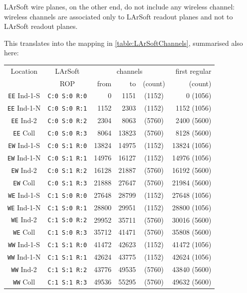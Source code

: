 LArSoft wire planes, on the other end, do not include any wireless channel:
wireless channels are associated only to LArSoft readout planes
and not to LArSoft readout planes.

This translates into the mapping in \cref{table:LArSoftChannels}, summarised also here:
\begin{center}
  \begin{tabular}{|cc|rrc|r|}
    \hline
    \hline
    Location            & LArSoft              & \multicolumn{3}{c|}{channels}
                                                                         & first regular \\
                        & ROP                  &  from &    to & (count) &       (count) \\
    \hline
    \texttt{EE} Ind-1-S & \texttt{C:0 S:0 R:0} &     0 &  1151 &  (1152) &      0 (1056) \\
    \texttt{EE} Ind-1-N & \texttt{C:0 S:0 R:1} &  1152 &  2303 &  (1152) &   1152 (1056) \\
    \texttt{EE} Ind-2   & \texttt{C:0 S:0 R:2} &  2304 &  8063 &  (5760) &   2400 (5600) \\
    \texttt{EE} Coll    & \texttt{C:0 S:0 R:3} &  8064 & 13823 &  (5760) &   8128 (5600) \\
    \hline
    \texttt{EW} Ind-1-S & \texttt{C:0 S:1 R:0} & 13824 & 14975 &  (1152) &  13824 (1056) \\
    \texttt{EW} Ind-1-N & \texttt{C:0 S:1 R:1} & 14976 & 16127 &  (1152) &  14976 (1056) \\
    \texttt{EW} Ind-2   & \texttt{C:0 S:1 R:2} & 16128 & 21887 &  (5760) &  16192 (5600) \\
    \texttt{EW} Coll    & \texttt{C:0 S:1 R:3} & 21888 & 27647 &  (5760) &  21984 (5600) \\
    \hline
    \hline
    \texttt{WE} Ind-1-S & \texttt{C:1 S:0 R:0} & 27648 & 28799 &  (1152) &  27648 (1056) \\
    \texttt{WE} Ind-1-N & \texttt{C:1 S:0 R:1} & 28800 & 29951 &  (1152) &  28800 (1056) \\
    \texttt{WE} Ind-2   & \texttt{C:1 S:0 R:2} & 29952 & 35711 &  (5760) &  30016 (5600) \\
    \texttt{WE} Coll    & \texttt{C:1 S:0 R:3} & 35712 & 41471 &  (5760) &  35808 (5600) \\
    \hline
    \texttt{WW} Ind-1-S & \texttt{C:1 S:1 R:0} & 41472 & 42623 &  (1152) &  41472 (1056) \\
    \texttt{WW} Ind-1-N & \texttt{C:1 S:1 R:1} & 42624 & 43775 &  (1152) &  42624 (1056) \\
    \texttt{WW} Ind-2   & \texttt{C:1 S:1 R:2} & 43776 & 49535 &  (5760) &  43840 (5600) \\
    \texttt{WW} Coll    & \texttt{C:1 S:1 R:3} & 49536 & 55295 &  (5760) &  49632 (5600) \\
    \hline
    \hline
  \end{tabular}
  \label{tab:LArSoftChannelsReduced}
\end{center}
